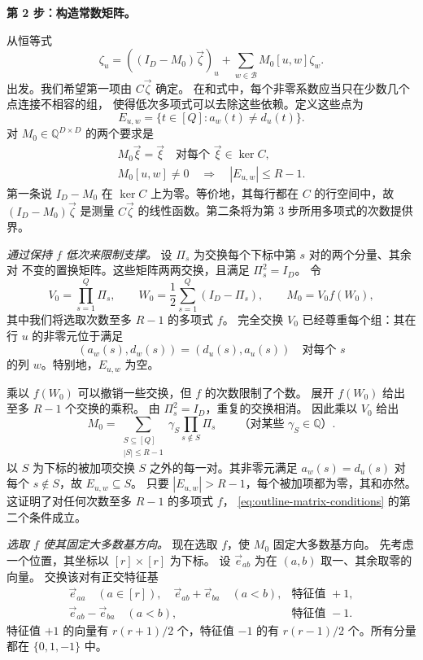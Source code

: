 \medskip\noindent
\textbf{第 2 步：构造常数矩阵。}\par\nobreak
\smallskip\noindent
从恒等式
\[
 \zeta_u=((I_D-M_0)\vec\zeta)_u+
                   \sum_{w\in\mathcal B}M_0[u,w]\zeta_w.
\]
出发。我们希望第一项由 $C\vec\zeta$ 确定。
在和式中，每个非零系数应当只在少数几个点连接不相容的组，
使得低次多项式可以去除这些依赖。定义这些点为
\[
 E_{u,w}=\{t\in[Q]:a_w(t)\ne d_u(t)\}.
\]
对 $M_0\in\mathbb Q^{D\times D}$ 的两个要求是
\begin{equation}\label{eq:outline-matrix-conditions}
 \begin{gathered}
 M_0\vec\xi=\vec\xi\quad\text{对每个 }\vec\xi\in\ker C,\\
 M_0[u,w]\ne0\quad\Longrightarrow\quad |E_{u,w}|\le R-1.
 \end{gathered}
\end{equation}
第一条说 $I_D-M_0$ 在 $\ker C$ 上为零。等价地，其每行都在
$C$ 的行空间中，故 $(I_D-M_0)\vec\zeta$ 是测量 $C\vec\zeta$
的线性函数。第二条将为第 3 步所用多项式的次数提供界。

\smallskip\noindent
\emph{通过保持 $f$ 低次来限制支撑。}
设 $\Pi_s$ 为交换每个下标中第 $s$ 对的两个分量、其余对
不变的置换矩阵。这些矩阵两两交换，且满足 $\Pi_s^2=I_D$。
令
\[
 V_0=\prod_{s=1}^Q\Pi_s,\qquad
 W_0=\frac12\sum_{s=1}^Q(I_D-\Pi_s),\qquad
 M_0=V_0f(W_0),
\]
其中我们将选取次数至多 $R-1$ 的多项式 $f$。
完全交换 $V_0$ 已经尊重每个组：其在行 $u$ 的非零元位于满足
\[
 (a_w(s),d_w(s))=(d_u(s),a_u(s))\quad\text{对每个 }s
\]
的列 $w$。特别地，$E_{u,w}$ 为空。

乘以 $f(W_0)$ 可以撤销一些交换，但 $f$ 的次数限制了个数。
展开 $f(W_0)$ 给出至多 $R-1$ 个交换的乘积。
由 $\Pi_s^2=I_D$，重复的交换相消。
因此乘以 $V_0$ 给出
\begin{equation}\label{eq:overview-partial-swaps}
 M_0=\sum_{\substack{S\subseteq[Q]\\|S|\le R-1}}
             \gamma_S\prod_{s\notin S}\Pi_s
 \qquad\text{（对某些 }\gamma_S\in\mathbb Q\text{）}.
\end{equation}
以 $S$ 为下标的被加项交换 $S$ 之外的每一对。其非零元满足
$a_w(s)=d_u(s)$ 对每个 $s\notin S$，故 $E_{u,w}\subseteq S$。
只要 $|E_{u,w}|>R-1$，每个被加项都为零，其和亦然。
这证明了对任何次数至多 $R-1$ 的多项式 $f$，
\eqref{eq:outline-matrix-conditions} 的第二个条件成立。

\smallskip\noindent
\emph{选取 $f$ 使其固定大多数基方向。}
现在选取 $f$，使 $M_0$ 固定大多数基方向。
先考虑一个位置，其坐标以 $[r]\times[r]$ 为下标。
设 $\vec e_{ab}$ 为在 $(a,b)$ 取一、其余取零的向量。
交换该对有正交特征基
\[
 \begin{array}{ll}
 \vec e_{aa}\quad(a\in[r]),\quad
 \vec e_{ab}+\vec e_{ba}\quad(a<b),
     &\text{特征值 }+1,\\[2pt]
 \vec e_{ab}-\vec e_{ba}\quad(a<b),
     &\text{特征值 }-1.
 \end{array}
\]
特征值 $+1$ 的向量有 $r(r+1)/2$ 个，特征值 $-1$ 的有
$r(r-1)/2$ 个。所有分量都在 $\{0,1,-1\}$ 中。


